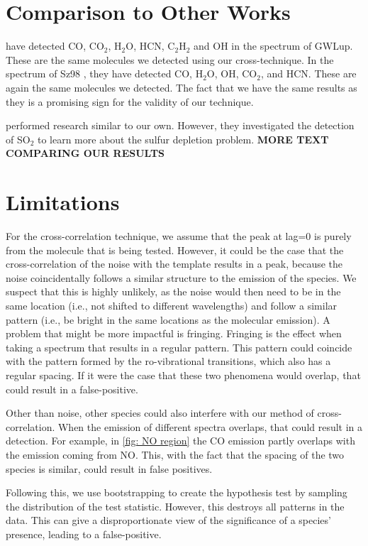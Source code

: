 \documentclass[twoside, single, authoryear, semicolon, 12pt]{lion-msc}
\newcommand{\4}{$_4$}
\newcommand{\3}{$_3$}
\newcommand{\2}{$_2$}
\begin{document}
\section{Comparison to Other Works}
\cite{Grant_2023} have detected CO, CO\2, H\2O, HCN, C\2H\2 and OH in the spectrum of GWLup. These are the same molecules we detected using our cross-technique. In the spectrum of Sz98 \cite{Gasman_2023}, they have detected CO, H\2O, OH, CO\2, and HCN. These are again the same molecules we detected. The fact that we have the same results as they is a promising sign for the validity of our technique. 

\cite{groningenthesis} performed research similar to our own. However, they investigated the detection of SO\2 to learn more about the sulfur depletion problem. \textbf{MORE TEXT COMPARING OUR RESULTS}

\section{Limitations}
For the cross-correlation technique, we assume that the peak at lag=0 is purely from the molecule that is being tested. However, it could be the case that the cross-correlation of the noise with the template results in a peak, because the noise coincidentally follows a similar structure to the emission of the species. We suspect that this is highly unlikely, as the noise would then need to be in the same location (i.e., not shifted to different wavelengths) and follow a similar pattern (i.e., be bright in the same locations as the molecular emission). A problem that might be more impactful is fringing. Fringing is the effect when taking a spectrum that results in a regular pattern. This pattern could coincide with the pattern formed by the ro-vibrational transitions, which also has a regular spacing. If it were the case that these two phenomena would overlap, that could result in a false-positive.

Other than noise, other species could also interfere with our method of cross-correlation. When the emission of different spectra overlaps, that could result in a detection. For example, in \autoref{fig: NO region} the CO emission partly overlaps with the emission coming from NO. This, with the fact that the spacing of the two species is similar, could result in false positives. 

Following this, we use bootstrapping to create the hypothesis test by sampling the distribution of the test statistic. However, this destroys all patterns in the data. This can give a disproportionate view of the significance of a species' presence, leading to a false-positive.
\end{document}
